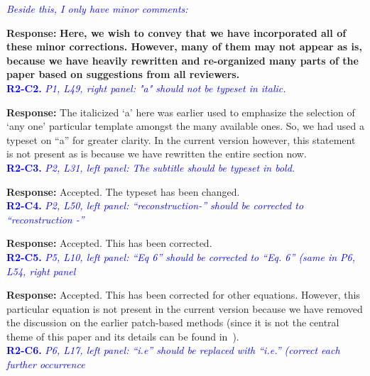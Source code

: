 \documentclass{article}
\begin{document}
\textcolor{blue}{\textit{Beside this, I only have minor comments:}}

\textbf{Response:}\textbf{ Here, we wish to convey that we have incorporated all of these minor corrections. However, many of them may not appear as is, because we have heavily rewritten and re-organized many parts of the paper based on  suggestions from all reviewers.}\\

\textcolor{blue}{\textbf{R2-C2.}\textit{ P1, L49, right panel: "a" should not be typeset in italic.}}

\textbf{Response:} The italicized `a' here was earlier used to emphasize the selection of `any one' particular template amongst the many available ones. So, we had used a typeset on ``a'' for greater clarity. In the current version however, this statement is not present as is because we have rewritten the entire section now.\\%

\textcolor{blue}{\textbf{R2-C3.}\textit{ P2, L31, left panel: The subtitle should be typeset in bold.}}

 \textbf{Response:} Accepted. The typeset has been changed.\\

\textcolor{blue}{\textbf{R2-C4.}\textit{ P2, L50, left panel: ``reconstruction-'' should be corrected to ``reconstruction -''}}

 \textbf{Response:} Accepted. This has been corrected.\\

\textcolor{blue}{\textbf{R2-C5.}\textit{ P5, L10, left panel: ``Eq 6'' should be corrected to ``Eq. 6'' (same in P6, L54, right panel}}

 \textbf{Response:} Accepted. This has been corrected for other equations. However, this particular equation is not present in the current version because we have removed the discussion on the earlier patch-based methods (since it is not the central theme of this paper and its details can be found in~\cite{my_dicta_paper}). \\

\textcolor{blue}{\textbf{R2-C6.}\textit{ P6, L17, left panel: ``i.e'' should be replaced with ``i.e.'' (correct each further occurrence}}
\end{document}
